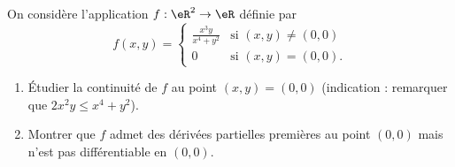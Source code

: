 \begin{exercice}\label{exoCalculDifferentiel0004}

On considère l'application $f : \eR ^2 \to \eR $ définie par
\begin{equation}
	f(x,y) =
	\begin{cases}
		\frac{x^3y}{x^4+y^2} 	&	\text{si $(x,y)\neq(0,0)$}\\
		0			&	 \text{si $(x,y)=(0,0)$.}
	\end{cases}
\end{equation}

\begin{enumerate}
	\item
 Étudier   la continuité de $f$ au point $(x,y)=(0,0)$ (indication : remarquer que $2x^2y \le x^4+y^2$).
 \item
 Montrer que $f$ admet des dérivées partielles premières au point $(0,0)$ mais n'est pas différentiable en $(0,0)$.
\end{enumerate}


\end{exercice}
